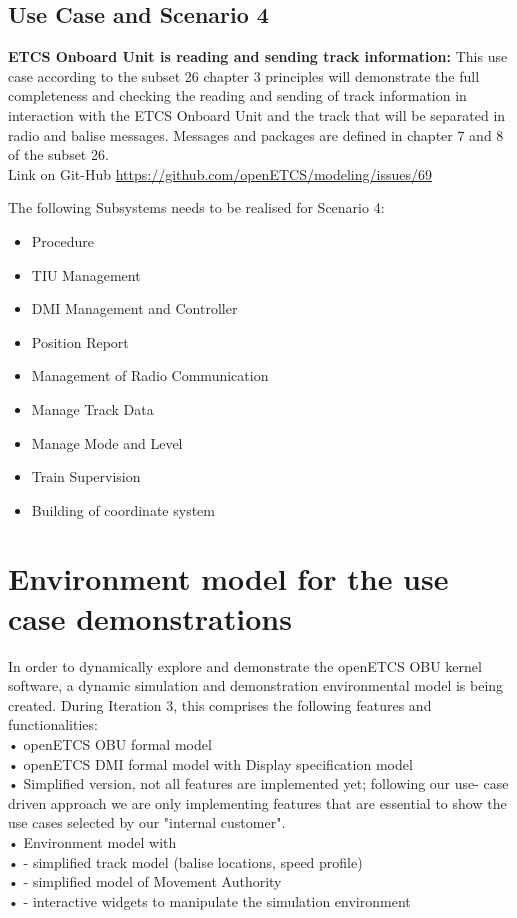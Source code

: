 \subsection{Use Case and Scenario 4}
\textbf{ETCS Onboard Unit is reading and sending track information:}
This use case according to the subset 26 chapter 3 principles will demonstrate the full completeness and checking the reading and sending of track information in interaction with the ETCS Onboard Unit and the track that will be separated in radio and balise messages. Messages and packages are defined in chapter 7 and 8 of the subset 26.\\ 
Link on Git-Hub \url{https://github.com/openETCS/modeling/issues/69}

The following Subsystems needs to be realised for Scenario 4:\\
\begin{itemize}
\item Procedure
\item TIU Management
\item DMI Management and Controller
\item Position Report
\item Management of Radio Communication
\item Manage Track Data
\item Manage Mode and Level
\item Train Supervision
\item Building of coordinate system
\end{itemize}

\section{Environment model for the use case demonstrations}

%
%
%

In order to dynamically explore and demonstrate the openETCS OBU kernel software, a dynamic simulation and demonstration environmental model is being created.
During Iteration 3, this comprises the following features and functionalities:\\
•   openETCS OBU formal model \\
•   openETCS DMI formal model with Display specification model\\
•      Simplified version, not all features are implemented yet; following our use- case driven approach we are only implementing features that are essential to show the use cases selected by our "internal customer".\\
•    Environment model with \\
•  	- simplified track model (balise locations, speed profile)\\
•  	- simplified model of Movement Authority\\
•  	- interactive widgets to manipulate the simulation environment\\
\\
\\
\\


